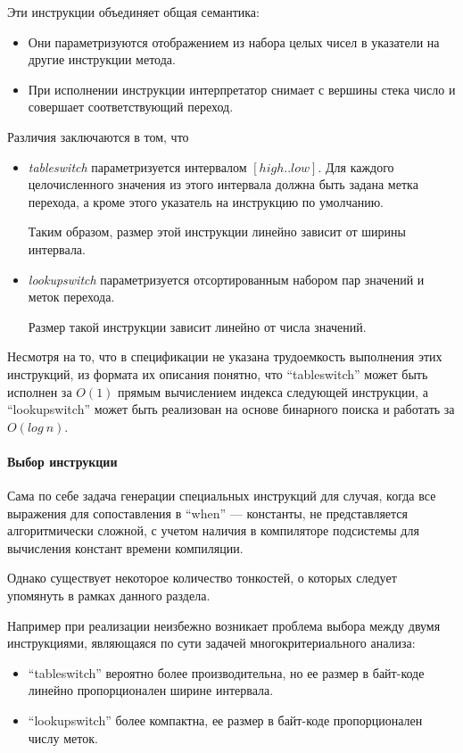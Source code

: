 Эти инструкции объединяет общая семантика:
\begin{itemize}
    \item Они параметризуются отображением из набора целых чисел в указатели на другие инструкции
    метода.
    \item При исполнении инструкции интерпретатор снимает с вершины стека число и совершает
    соответствующий переход.
\end{itemize}

Различия заключаются в том, что
\begin{itemize}
    \item \textit{tableswitch} параметризуется интервалом $[high..low]$.
    Для каждого целочисленного значения из этого интервала должна быть задана метка перехода,
    а кроме этого указатель на инструкцию по умолчанию.

    Таким образом, размер этой инструкции линейно зависит от ширины интервала.
    \item \textit{lookupswitch} параметризуется отсортированным набором пар значений и меток
    перехода.

    Размер такой инструкции зависит линейно от числа значений.
\end{itemize}

Несмотря на то, что в спецификации не указана трудоемкость выполнения этих инструкций, из формата
их описания понятно, что ``tableswitch'' может быть исполнен за $O(1)$ прямым вычислением индекса
следующей инструкции, а ``lookupswitch'' может быть реализован на основе бинарного поиска и
работать за $O(log\ n)$.

\paragraph{Выбор инструкции}
Сама по себе задача генерации специальных инструкций для случая, когда все выражения
для сопоставления в ``when'' --- константы, не представляется алгоритмически сложной, с учетом
наличия в компиляторе подсистемы для вычисления констант времени компиляции.

Однако существует некоторое количество тонкостей, о которых следует упомянуть в рамках данного
раздела.

Например при реализации неизбежно возникает проблема выбора между двумя инструкциями,
являющаяся по сути задачей многокритериального анализа:
\begin{itemize}
    \item ``tableswitch'' вероятно более производительна, но ее размер в байт-коде линейно
    пропорционален ширине интервала.
    \item ``lookupswitch'' более компактна, ее размер в байт-коде пропорционален числу меток.
\end{itemize}

